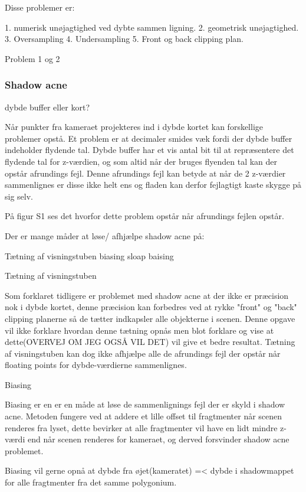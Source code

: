 \documentclass[11pt,a4paper]{article}
\begin{document}
Disse problemer er:

1. numerisk unøjagtighed ved dybte sammen ligning.
2. geometrisk unøjagtighed.
3. Oversampling
4. Undersampling
5. Front og back clipping plan.



Problem 1 og 2 
 
 
 
\subsubsection{Shadow acne}

dybde buffer eller kort?

Når punkter fra kameraet projekteres ind i dybde kortet kan forskellige problemer opstå. Et problem er at decimaler smides væk fordi der dybde buffer indeholder flydende tal. Dybde buffer har et vis antal bit til at repræsentere det flydende tal for z-værdien,  og som altid når der bruges flyenden tal kan der opstår afrundings fejl. Denne afrundings fejl kan betyde at når de 2 z-værdier sammenlignes er disse ikke helt ens og fladen kan derfor fejlagtigt kaste skygge på sig selv. 

På figur S1 ses det hvorfor dette problem opstår når afrundings fejlen opstår.


Der er mange måder at løse/ afhjælpe shadow acne på:

Tætning af visningstuben
biasing
	sloap baising


Tætning af visningstuben

Som forklaret tidligere er problemet med shadow acne at der ikke er præcision nok i dybde kortet, denne præcision kan forbedres ved at rykke  "front"  og "back" clipping planerne så de tætter indkapsler alle objekterne i scenen. Denne opgave vil ikke forklare hvordan denne tætning opnås men blot forklare og vise at dette(OVERVEJ OM JEG OGSÅ VIL DET) vil give et bedre resultat. Tætning af visningstuben kan dog ikke afhjælpe alle de afrundings fejl der opstår når floating points for dybde-værdierne sammenlignes.

Biasing

Biasing er en er en måde at løse de sammenlignings fejl der er skyld i shadow acne. Metoden fungere ved at addere et lille offset til fragtmenter når scenen renderes fra lyset, dette bevirker at alle fragtmenter vil have en lidt mindre z-værdi end når scenen renderes for kameraet, og derved forsvinder shadow acne problemet. 

Biasing vil gerne opnå at dybde fra øjet(kameratet) =< dybde i shadowmappet for alle fragtmenter fra det samme polygonium.
\end{document}
